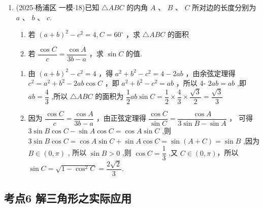 \begin{enumerate}
\begin{jieda}
\begin{enumerate}
            \item 由正弦定理得， $a = 4\sin A$ ， $c = 4\sin \left( {{60}^{ \circ  } - A}\right)$ ，所以 $\bigtriangleup {ABC}$ 的周长为 $a + b + c = 4\sin A + 4\sin \left( {{60}^{ \circ  } - A}\right)  + 2\sqrt{3} =  4\sin \left( {A + {60}^{ \circ  }}\right)  + 2\sqrt{3},{0}^{ \circ  } < A < {60}^{ \circ  }$ ,当 $A = {30}^{ \circ  }$ 时, $\bigtriangleup {ABC}$ 的周长的最大值为 $4 + 2\sqrt{3}$.
        \end{enumerate}
    \end{jieda}

    \item (2025$\cdot$杨浦区 一模$\cdot$18)已知 $\bigtriangleup  {ABC}$ 的内角 $A$ 、 $B$ 、 $C$ 所对边的长度分别为 $a$ 、 $b$ 、 $c$.
    \begin{enumerate}
        \item 若 ${\left( a + b\right) }^{2} - {c}^{2} = 4,C = {60}^{ \circ  }$ ，求 $\bigtriangleup  {ABC}$ 的面积
        \item 若 $\dfrac{\cos C}{c} = \dfrac{\cos A}{{3b} - a}$ ，求 $\sin C$ 的值.
    \end{enumerate}
    \begin{jieda}
        \begin{enumerate}
            \item 由 ${\left( a + b\right) }^{2} - {c}^{2} = 4$ ，得 ${a}^{2} + {b}^{2} - {c}^{2} = 4 - {2ab}$ ，由余弦定理得 ${c}^{2} = {a}^{2} + {b}^{2} - {2ab}\cos C$ ，即 ${a}^{2} + {b}^{2} - {c}^{2} = {ab}$ ，所以 4- ${2ab} = {ab}$ ,即 ${ab} = \dfrac{4}{3}$ ,所以 $\bigtriangleup {ABC}$ 的面积为 $\dfrac{1}{2}{ab}\sin C = \dfrac{1}{2} \times  \dfrac{4}{3} \times  \dfrac{\sqrt{3}}{2} = \dfrac{\sqrt{3}}{3}$
            
            \item 因为 $\dfrac{\cos C}{c} = \dfrac{\cos A}{{3b} - a}$ ，由正弦定理得 $\dfrac{\cos C}{\sin C} = \dfrac{\cos A}{3\sin B - \sin A}$ ， 可得 $3\sin B\cos C - \sin A\cos C = \cos A\sin C$ ,则 $3\sin B\cos C =  \cos A\sin C + \sin A\cos C = \sin \left( {A + C}\right)  = \sin B$ ,因为 $B \in  \left( {0,\pi }\right)$ , 所以 $\sin B > 0$ ,则 $\cos C = \dfrac{1}{3}$ ,又 $C \in  \left( {0,\pi }\right)$，所以 $\sin C = \sqrt{1 - {\cos }^{2}C} = \dfrac{2\sqrt{2}}{3}$.
        \end{enumerate}
    \end{jieda}
\end{enumerate}

\subsection*{考点6 解三角形之实际应用}

